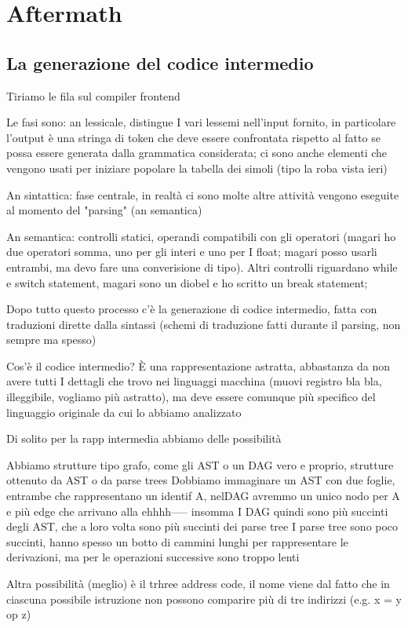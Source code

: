 \documentclass[class=book, crop=false, oneside, 12pt]{standalone}
\begin{document}
\part{Aftermath}
\chapter{La generazione del codice intermedio}
Tiriamo le fila sul compiler frontend

Le fasi sono: an lessicale, distingue I vari lessemi nell'input fornito, in particolare l'output è una stringa di token che deve essere confrontata rispetto al fatto se possa essere generata dalla grammatica considerata; ci sono anche elementi che vengono usati per iniziare  popolare la tabella dei simoli (tipo la roba vista ieri)

An sintattica: fase centrale, in realtà ci sono molte altre attività vengono eseguite al momento del "parsing" (an semantica) 

An semantica: controlli statici, operandi compatibili con gli operatori (magari ho due operatori somma, uno per gli interi e uno per I float; magari posso usarli entrambi, ma devo fare una converisione di tipo). Altri controlli riguardano while e switch statement, magari sono un diobel e ho scritto un break statement;

Dopo tutto questo processo c'è la generazione di codice intermedio, fatta con traduzioni dirette dalla sintassi (schemi di traduzione fatti durante il parsing, non sempre ma spesso)

Cos'è il codice intermedio? È una rappresentazione astratta, abbastanza da non avere tutti I dettagli che trovo nei linguaggi macchina (muovi registro bla bla, illeggibile, vogliamo più astratto), ma deve essere comunque più specifico del linguaggio originale da cui lo abbiamo analizzato

Di solito per la rapp intermedia abbiamo delle possibilità

Abbiamo strutture tipo grafo, come gli AST o un DAG vero e proprio, strutture ottenuto da AST o da parse trees
Dobbiamo immaginare un AST con due foglie, entrambe che rappresentano un identif A, nelDAG avremmo un unico nodo per A e più edge che arrivano alla ehhhh----- insomma I DAG quindi sono più succinti degli AST, che a loro volta sono più succinti dei parse tree
I parse tree sono poco succinti, hanno spesso un botto di cammini lunghi per rappresentare le derivazioni, ma per le operazioni successive sono troppo lenti

Altra possibilità (meglio) è il trhree address code, il nome viene dal fatto che in ciascuna possibile istruzione non possono comparire più di tre indirizzi (e.g. x = y op z)
\end{document}

